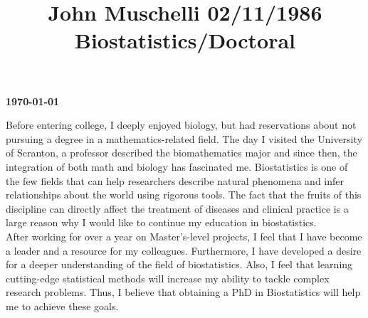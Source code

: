 \documentclass[12pt]{article}
\title{John Muschelli  \hfill 02/11/1986 \hfill Biostatistics/Doctoral} %
\begin{document}
\newbox\TempBox \newbox\TempBoxA
%
\def\undertilde#1{%
  \ifmmode\setbox\TempBox=\hbox{$#1$}\else\setbox\TempBox=\hbox{#1}\fi%
  \setbox\TempBoxA=\hbox to \wd\TempBox{\hss\char'176\hss}%
  \rlap{\copy\TempBox}\smash{\lower9pt\hbox{\copy\TempBoxA}}%
}
%
\def\undertildelow#1{%
  \ifmmode\setbox\TempBox=\hbox{$#1$}\else\setbox\TempBox=\hbox{#1}\fi%
  \setbox\TempBoxA=\hbox to \wd\TempBox{\hss\char'176\hss}%
  \rlap{\copy\TempBox}\smash{\lower10pt\hbox{\copy\TempBoxA}}%
}




\hfill {\bf \today\\}

Before entering college, I deeply enjoyed biology, but had reservations about not pursuing a degree in a mathematics-related field.   The day I visited the University of Scranton, a professor described the biomathematics major and since then, the integration of both math and biology has fascinated me.  Biostatistics is one of the few fields that can help researchers describe natural phenomena and infer relationships about the world using rigorous tools. The fact that the fruits of this discipline can directly affect the treatment of diseases and clinical practice is a large reason why I would like to continue my education in biostatistics. \\
 
After working for over a year on Master's-level projects, I feel that I have become a leader and a resource for my colleagues. Furthermore, I have developed a desire for a deeper understanding of the field of biostatistics.   Also, I feel that learning cutting-edge statistical methods will increase my ability to tackle complex research problems.  Thus, I believe that obtaining a PhD in Biostatistics will help me to achieve these goals. \\
\end{document}
